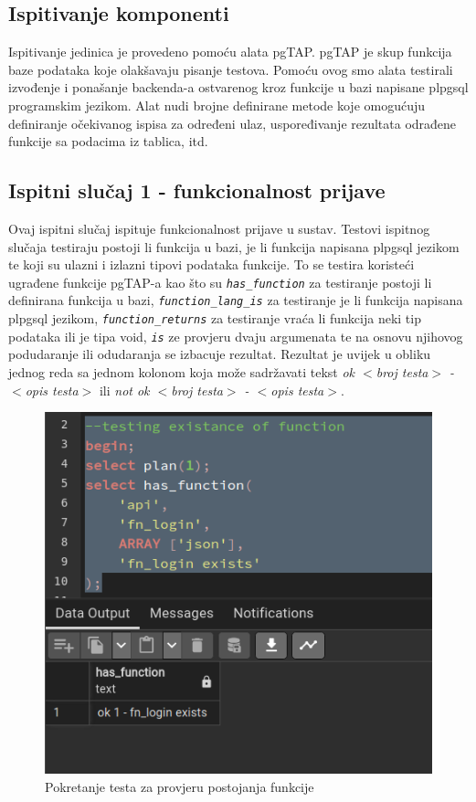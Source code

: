			\subsection{Ispitivanje komponenti}
				Ispitivanje jedinica je provedeno pomoću alata pgTAP. pgTAP je skup funkcija baze podataka koje olakšavaju pisanje testova. Pomoću ovog smo alata testirali izvođenje i ponašanje backenda-a ostvarenog kroz funkcije u bazi napisane plpgsql programskim jezikom. Alat nudi brojne definirane metode koje omogućuju definiranje očekivanog ispisa za određeni ulaz, uspoređivanje rezultata odrađene funkcije sa podacima iz tablica, itd.
				\eject
				\subsection{Ispitni slučaj 1 - funkcionalnost prijave}
				Ovaj ispitni slučaj ispituje funkcionalnost prijave u sustav. Testovi ispitnog slučaja testiraju postoji li funkcija u bazi, je li funkcija napisana plpgsql jezikom te koji su ulazni i izlazni tipovi podataka funkcije. To se testira koristeći ugrađene funkcije pgTAP-a kao što su \textit{\texttt{has\_function}} za testiranje postoji li definirana funkcija u bazi, \textit{\texttt{function\_lang\_is}} za testiranje je li funkcija napisana plpgsql jezikom, \textit{\texttt{function\_returns}} za testiranje vraća li funkcija neki tip podataka ili je tipa void, \textit{\texttt{is\(\)}} ze provjeru dvaju argumenata te na osnovu njihovog podudaranje ili odudaranja se izbacuje rezultat. Rezultat je uvijek u obliku jednog reda sa jednom kolonom koja može sadržavati tekst \textit{ok $<$broj testa$>$ - $<$opis testa$>$} ili \textit{not ok $<$broj testa$>$ - $<$opis testa$>$}.
				\begin{figure}[H]
					\centering
					\includegraphics[width=\textwidth]{slike/unit_tests/ut_1/has_func.png}
					\caption{Pokretanje testa za provjeru postojanja funkcije}
					\label{fig: IS1-has_function}
				\end{figure}
